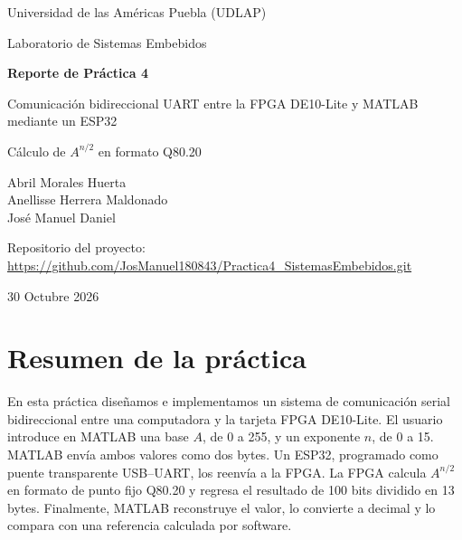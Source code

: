 \documentclass[11pt,letterpaper]{article}
\newcommand{\repourl}{https://github.com/JosManuel180843/Practica4_SistemasEmbebidos.git}
\begin{document}
\begin{titlepage}
\centering
\vspace*{1.5cm}

{\large Universidad de las Américas Puebla (UDLAP)\par}
\vspace{0.3cm}
{\large Laboratorio de Sistemas Embebidos\par}

\vspace{2.5cm}

{\Large\bfseries Reporte de Práctica 4\par}
\vspace{0.6cm}
{\LARGE Comunicación bidireccional UART entre la FPGA DE10-Lite y MATLAB
mediante un ESP32\par}
\vspace{0.6cm}
{\Large Cálculo de $A^{n/2}$ en formato Q80.20\par}

\vspace{2.5cm}

{\large
Abril Morales Huerta\\[0.2em]
Anellisse Herrera Maldonado\\[0.2em]
José Manuel Daniel\par}

\vfill

{\small Repositorio del proyecto:\\
\url{\repourl}\par}

\vspace{1cm}
{\large 30 Octubre 2026\par}
\end{titlepage}

\section{Resumen de la práctica}

En esta práctica diseñamos e implementamos un sistema de comunicación serial
bidireccional entre una computadora y la tarjeta FPGA DE10-Lite. El usuario
introduce en MATLAB una base $A$, de 0 a 255, y un exponente $n$, de 0 a 15.
MATLAB envía ambos valores como dos bytes. Un ESP32, programado como puente
transparente USB--UART, los reenvía a la FPGA. La FPGA calcula $A^{n/2}$ en
formato de punto fijo Q80.20 y regresa el resultado de 100 bits dividido en
13 bytes. Finalmente, MATLAB reconstruye el valor, lo convierte a decimal y
lo compara con una referencia calculada por software.
\end{document}
